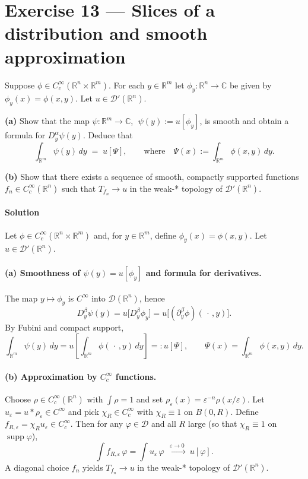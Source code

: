 \documentclass[12pt,a4paper]{article}
\theoremstyle{plain}
\theoremstyle{definition}
\theoremstyle{remark}
\theoremstyle{remark}
\begin{document}
\section*{Exercise 13 — Slices of a distribution and smooth approximation}

Suppose $\phi\in C_c^\infty(\mathbb R^n\times\mathbb R^m)$. For each $y\in\mathbb R^m$ let
$\phi_y:\mathbb R^n\to\mathbb C$ be given by $\phi_y(x)=\phi(x,y)$. Let $u\in\mathcal D'(\mathbb R^n)$.

\smallskip
\noindent
\textbf{(a)} Show that the map $\psi:\mathbb R^m\to\mathbb C$, $\;\psi(y):=u[\phi_y]$, is smooth and obtain a formula for
$D_y^\alpha\psi(y)$. Deduce that
\[
\int_{\mathbb R^m}\psi(y)\,dy \;=\; u[\Psi], \qquad
\text{where}\quad \Psi(x):=\int_{\mathbb R^m}\phi(x,y)\,dy.
\]

\smallskip
\noindent
\textbf{(b)} Show that there exists a sequence of smooth, compactly supported functions
$f_n\in C_c^\infty(\mathbb R^n)$ such that $T_{f_n}\to u$ in the weak-* topology of $\mathcal D'(\mathbb R^n)$.

\paragraph*{Solution}

Let $\phi\in C_c^\infty(\mathbb R^n\times\mathbb R^m)$ and, for $y\in\mathbb R^m$, define $\phi_y(x)=\phi(x,y)$.
Let $u\in\mathcal D'(\mathbb R^n)$.

\paragraph{(a) Smoothness of $\psi(y)=u[\phi_y]$ and formula for derivatives.}
The map $y\mapsto\phi_y$ is $C^\infty$ into $\mathcal D(\mathbb R^n)$, hence
\[
D_y^\beta\psi(y)=u\!\big[D_y^\beta\phi_y\big]
= u\!\big[(\partial_y^\beta\phi)(\,\cdot\,,y)\big].
\]
By Fubini and compact support,
\[
\int_{\mathbb R^m}\psi(y)\,dy
= u\!\left[\int_{\mathbb R^m}\phi(\,\cdot\,,y)\,dy\right]
=: u[\Psi],\qquad \Psi(x)=\int_{\mathbb R^m}\phi(x,y)\,dy.
\]

\paragraph{(b) Approximation by $C_c^\infty$ functions.}
Choose $\rho\in C_c^\infty(\mathbb R^n)$ with $\int\rho=1$ and set $\rho_\varepsilon(x)=\varepsilon^{-n}\rho(x/\varepsilon)$.
Let $u_\varepsilon=u*\rho_\varepsilon\in C^\infty$ and pick $\chi_R\in C_c^\infty$ with $\chi_R\equiv1$ on $B(0,R)$.
Define $f_{R,\varepsilon}=\chi_R u_\varepsilon\in C_c^\infty$.
Then for any $\varphi\in\mathcal D$ and all $R$ large (so that $\chi_R\equiv1$ on $\operatorname{supp}\varphi$),
\[
\int f_{R,\varepsilon}\,\varphi
=\int u_\varepsilon\,\varphi \ \xrightarrow{\ \varepsilon\to0\ }\ u[\varphi].
\]
A diagonal choice $f_n$ yields $T_{f_n}\to u$ in the weak-* topology of $\mathcal D'(\mathbb R^n)$.
\end{document}
